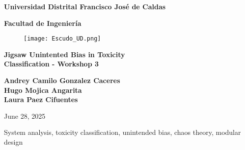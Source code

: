 \documentclass[conference]{IEEEtran}
\newcommand{\university}{Universidad Distrital Francisco José de Caldas}
\newcommand{\faculty}{Facultad de Ingeniería}
\newcommand{\titletext}{Jigsaw Unintented Bias in Toxicity \\Classification - Workshop 3}
\newcommand{\authorone}{Andrey Camilo Gonzalez Caceres}
\newcommand{\authortwo}{Hugo Mojica Angarita}
\newcommand{\authorthree}{Laura Paez Cifuentes}
\newcommand{\thedate}{June 28, 2025}
\begin{document}
\begin{titlepage}
    \begin{center}
        \vspace*{1cm}
        
        \Huge
        \textbf{\university}
        
        \vspace{0.5cm}
        \LARGE
        \textbf{\faculty}
        
        \vspace{0.5cm} 
        \begin{figure}[h] 
            \centering
            \texttt{[image: Escudo\_UD.png]} 
            \label{fig:university-logo}
        \end{figure}
    
        \vspace{1cm}
        \Huge
        \textbf{\titletext}
        
        \vspace{2.7cm}
        
        \Large
        \textbf{\authorone} \\
        \textbf{\authortwo} \\
        \textbf{\authorthree}
        
        \vfill
        
        \large
        \vspace{1cm}
        \thedate
        
    \end{center}
\end{titlepage}


\begin{abstract}
This article presents the analysis and explanation of much of the extremely important part of the code used to run the simulations for the Kaggle competition "Jigsaw Unintended Bias in Toxicity Classification." We show how, through certain key functions such as TextCleaner and Detect, among other very important ones, we managed to filter and clean the sentences, detecting different variables such as identity or sarcasm, and identifying and evaluating them accordingly. It is possible to detect the possibility of sentences by varying their context and how they are interpreted, taking into account that certain words can mean something different in two different sentences.
\end{abstract}

\begin{IEEEkeywords}
System analysis, toxicity classification, unintended bias, chaos theory, modular design
\end{IEEEkeywords}
\end{document}
